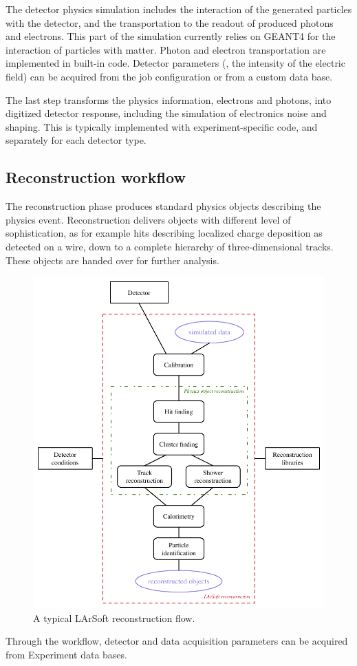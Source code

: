 The detector physics simulation includes the interaction of the
generated particles with the detector,
and the transportation to the readout of produced photons and electrons.
This part of the simulation currently relies on GEANT4 for the interaction of particles with matter.
Photon and electron transportation are implemented in built-in code.
Detector parameters (\eg, the intensity of the electric field)
can be acquired from the job configuration or from a custom data base.

The last step transforms the physics information, electrons and photons,
into digitized detector response,
including the simulation of electronics noise and shaping.
This is typically implemented with experiment-specific code,
and separately for each detector type.


\subsection{Reconstruction workflow}
\label{ssec:Workflows:Reconstruction}

The reconstruction phase produces standard physics objects describing the physics event.
Reconstruction delivers objects with different level of sophistication,
as for example hits describing localized charge deposition as detected on a wire,
down to a complete hierarchy of three-dimensional tracks.
These objects are handed over for further analysis.
\begin{figure}
   \centering
   \includegraphics{figures/LArSoftReconstructionWorkflow.pdf}
   \caption{\label{fig:LArSoftReconstruction}A typical LArSoft reconstruction flow.}
\end{figure}
Through the workflow, detector and data acquisition parameters
can be acquired from Experiment data bases.

